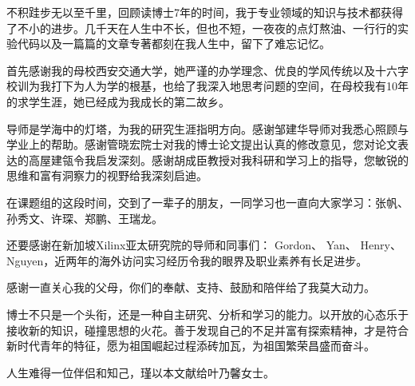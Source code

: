 


不积跬步无以至千里，回顾读博士7年的时间，我于专业领域的知识与技术都获得了不小的进步。几千天在人生中不长，但也不短，一夜夜的点灯熬油、一行行的实验代码以及一篇篇的文章专著都刻在我人生中，留下了难忘记忆。


首先感谢我的母校西安交通大学，她严谨的办学理念、优良的学风传统以及十六字校训为我打下为人为学的根基，也给了我深入地思考问题的空间，在母校我有10年的求学生涯，她已经成为我成长的第二故乡。

导师是学海中的灯塔，为我的研究生涯指明方向。感谢邹建华导师对我悉心照顾与学业上的帮助。感谢管晓宏院士对我的博士论文提出认真的修改意见，您对论文表达的高屋建瓴令我启发深刻。感谢胡成臣教授对我科研和学习上的指导，您敏锐的思维和富有洞察力的视野给我深刻启迪。

在课题组的这段时间，交到了一辈子的朋友，一同学习也一直向大家学习：张帆、孙秀文、许琛、郑鹏、王瑞龙。

还要感谢在新加坡Xilinx亚太研究院的导师和同事们： Gordon、 Yan、 Henry、 Nguyen，近两年的海外访问实习经历令我的眼界及职业素养有长足进步。

感谢一直关心我的父母，你们的奉献、支持、鼓励和陪伴给了我莫大动力。

博士不只是一个头衔，还是一种自主研究、分析和学习的能力。以开放的心态乐于接收新的知识，碰撞思想的火花。善于发现自己的不足并富有探索精神，才是符合新时代青年的特征，愿为祖国崛起过程添砖加瓦，为祖国繁荣昌盛而奋斗。

人生难得一位伴侣和知己，瑾以本文献给叶乃馨女士。

